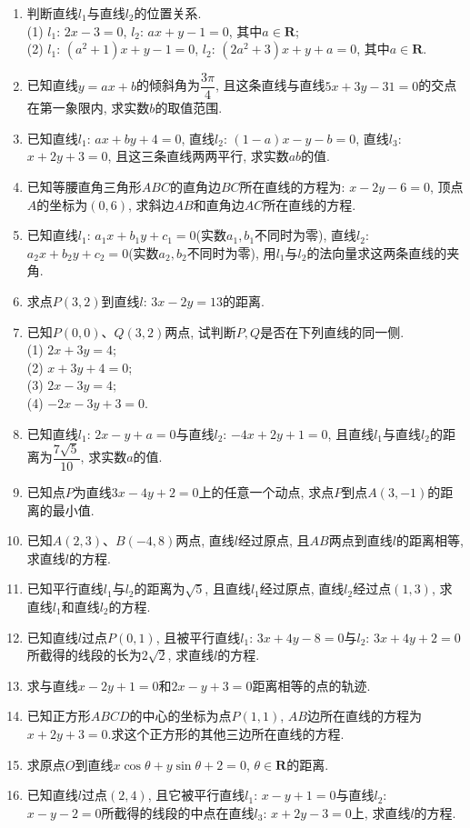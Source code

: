 \documentclass[10pt,a4paper]{article}
\begin{document}
\begin{enumerate}[1.]
\item 判断直线$l_1$与直线$l_2$的位置关系.\\
(1) $l_1$: $2x-3=0$, $l_2$: $ax+y-1=0$, 其中$a\in \mathbf{R}$;\\
(2) $l_1$: $(a^2+1)x+y-1=0$, $l_2$: $(2a^2+3)x+y+a=0$, 其中$a\in \mathbf{R}$.
\item 已知直线$y=ax+b$的倾斜角为$\dfrac{3\pi }4$, 且这条直线与直线$5x+3y-31=0$的交点在第一象限内, 求实数$b$的取值范围.
\item 已知直线$l_1$: $ax+by+4=0$, 直线$l_2$: $(1-a)x-y-b=0$, 直线$l_3$: $x+2y+3=0$, 且这三条直线两两平行, 求实数$ab$的值.
\item 已知等腰直角三角形$ABC$的直角边$BC$所在直线的方程为: $x-2y-6=0$, 顶点$A$的坐标为$(0,6)$, 求斜边$AB$和直角边$AC$所在直线的方程.
\item 已知直线$l_1$: $a_1x+b_1y+c_1=0$(实数$a_1,b_1$不同时为零), 直线$l_2$: $a_2x+b_2y+c_2=0$(实数$a_2,b_2$不同时为零), 用$l_1$与$l_2$的法向量求这两条直线的夹角.
\item 求点$P(3,2)$到直线$l$: $3x-2y=13$的距离.
\item 已知$P(0,0)$、$Q(3,2)$两点, 试判断$P,Q$是否在下列直线的同一侧.\\
(1) $2x+3y=4$;\\ 
(2) $x+3y+4=0$;\\
(3) $2x-3y=4$;\\ 
(4) $-2x-3y+3=0$.
\item 已知直线$l_1$: $2x-y+a=0$与直线$l_2$: $-4x+2y+1=0$, 且直线$l_1$与直线$l_2$的距离为$\dfrac{7\sqrt 5}{10}$, 求实数$a$的值.
\item 已知点$P$为直线$3x-4y+2=0$上的任意一个动点, 求点$P$到点$A(3,-1)$的距离的最小值.
\item 已知$A(2,3)$、$B(-4,8)$两点, 直线$l$经过原点, 且$AB$两点到直线$l$的距离相等, 求直线$l$的方程.
\item 已知平行直线$l_1$与$l_2$的距离为$\sqrt 5$, 且直线$l_1$经过原点, 直线$l_2$经过点$(1,3)$, 求直线$l_1$和直线$l_2$的方程.
\item 已知直线$l$过点$P(0,1)$, 且被平行直线$l_1$: $3x+4y-8=0$与$l_2$: $3x+4y+2=0$所截得的线段的长为$2\sqrt 2$, 求直线$l$的方程.
\item 求与直线$x-2y+1=0$和$2x-y+3=0$距离相等的点的轨迹.
\item 已知正方形$ABCD$的中心的坐标为点$P(1,1)$, $AB$边所在直线的方程为$x+2y+3=0$.求这个正方形的其他三边所在直线的方程.
\item 求原点$O$到直线$x\cos \theta +y\sin \theta +2=0$, $\theta \in \mathbf{R}$的距离.
\item 已知直线$l$过点$(2,4)$, 且它被平行直线$l_1$: $x-y+1=0$与直线$l_2$: $x-y-2=0$所截得的线段的中点在直线$l_3$: $x+2y-3=0$上, 求直线$l$的方程.

\end{enumerate}
\end{document}
